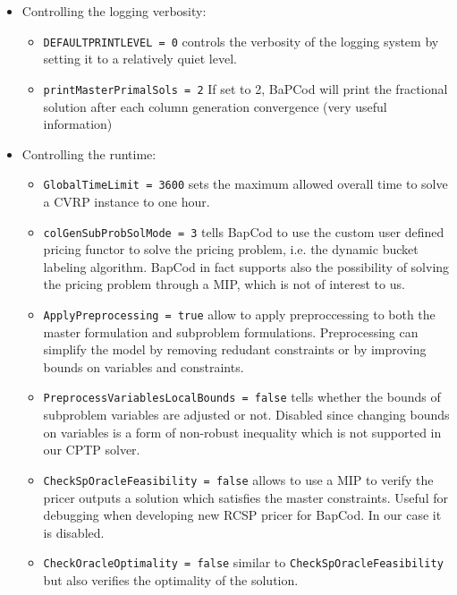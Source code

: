 \begin{itemize}
	\item Controlling the logging verbosity:
	      \begin{itemize}
		      \item \texttt{DEFAULTPRINTLEVEL = 0} controls the verbosity of the logging system by setting it to a relatively quiet level.
		      \item \texttt{printMasterPrimalSols = 2} If set to 2, BaPCod will print the fractional solution after each column generation convergence (very useful information)
	      \end{itemize}

	\item Controlling the runtime:
	      \begin{itemize}
		      \item \texttt{GlobalTimeLimit = 3600} sets the maximum allowed overall time to solve a CVRP instance to one hour.
		      \item \texttt{colGenSubProbSolMode = 3} tells BapCod to use the custom user defined pricing functor to solve the pricing problem, i.e. the dynamic bucket labeling algorithm.
		            BapCod in fact supports also the possibility of solving the pricing problem through a MIP, which is not of interest to us.
		      \item \texttt{ApplyPreprocessing = true} allow to apply preproccessing to both the master formulation and subproblem formulations.
		            Preprocessing can simplify the model by removing redudant constraints or by improving bounds on variables and constraints.
		      \item \texttt{PreprocessVariablesLocalBounds = false} tells whether the bounds of subproblem variables are adjusted or not. Disabled since changing bounds on variables is a form of non-robust inequality which is not supported in our CPTP solver.

		      \item \texttt{CheckSpOracleFeasibility = false} allows to use a MIP to verify the pricer outputs a solution which satisfies the master constraints. Useful for debugging when developing new RCSP pricer for BapCod.
		            In our case it is disabled.
		      \item \texttt{CheckOracleOptimality = false} similar to \texttt{CheckSpOracleFeasibility} but also verifies the optimality of the solution.
	      \end{itemize}



\end{itemize}
